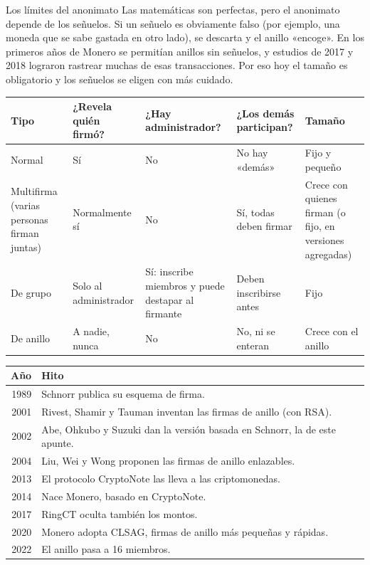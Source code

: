 \documentclass[11pt,a4paper]{article}
\theoremstyle{definition}
\theoremstyle{plain}
\theoremstyle{remark}
\begin{document}
\begin{aviso}{Los límites del anonimato}
Las matemáticas son perfectas, pero el anonimato depende de los señuelos. Si un
señuelo es obviamente falso (por ejemplo, una moneda que se sabe gastada en otro
lado), se descarta y el anillo «encoge». En los primeros años de Monero se permitían
anillos sin señuelos, y estudios de 2017 y 2018 lograron rastrear muchas de esas
transacciones. Por eso hoy el tamaño es obligatorio y los señuelos se eligen con más
cuidado.
\end{aviso}

\begin{center}\small
\captionsetup{type=table}
\caption{Cuatro tipos de firma frente a frente.}
\label{tab:tipos}
\begin{tabularx}{\textwidth}{@{}>{\raggedright\arraybackslash}p{2.7cm} >{\raggedright\arraybackslash}X >{\raggedright\arraybackslash}X >{\raggedright\arraybackslash}X >{\raggedright\arraybackslash}X@{}}
\toprule
\textbf{Tipo} & \textbf{¿Revela quién firmó?} & \textbf{¿Hay administrador?} & \textbf{¿Los demás participan?} & \textbf{Tamaño} \\
\midrule
Normal & \textcolor{coralc}{Sí} & No & No hay «demás» & Fijo y pequeño \\
Multifirma (varias personas firman juntas) & \textcolor{amberc}{Normalmente sí} & No & Sí, todas deben firmar & Crece con quienes firman (o fijo, en versiones agregadas) \\
De grupo & \textcolor{amberc}{Solo al administrador} & Sí: inscribe miembros y puede destapar al firmante & Deben inscribirse antes & Fijo \\
De anillo & \textcolor{mintc}{A nadie, nunca} & No & No, ni se enteran & Crece con el anillo \\
\bottomrule
\end{tabularx}
\end{center}

\begin{center}\small
\captionsetup{type=table}
\caption{Línea de tiempo.}
\label{tab:tiempo}
\begin{tabular}{@{}r l@{}}
\toprule
\textbf{Año} & \textbf{Hito} \\
\midrule
1989 & Schnorr publica su esquema de firma. \\
2001 & Rivest, Shamir y Tauman inventan las firmas de anillo (con RSA). \\
2002 & Abe, Ohkubo y Suzuki dan la versión basada en Schnorr, la de este apunte. \\
2004 & Liu, Wei y Wong proponen las firmas de anillo enlazables. \\
2013 & El protocolo CryptoNote las lleva a las criptomonedas. \\
2014 & Nace Monero, basado en CryptoNote. \\
2017 & RingCT oculta también los montos. \\
2020 & Monero adopta CLSAG, firmas de anillo más pequeñas y rápidas. \\
2022 & El anillo pasa a 16 miembros. \\
\bottomrule
\end{tabular}
\end{center}
\end{document}
